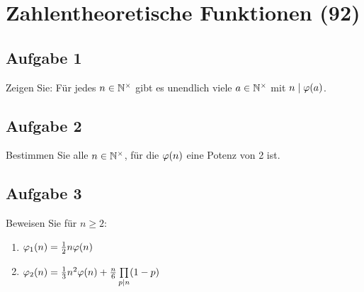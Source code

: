 \section{Zahlentheoretische Funktionen (92)}

\subsection{Aufgabe 1}
Zeigen Sie: Für jedes $n \in \mathbb{N}^\times$ gibt es
unendlich viele $a \in \mathbb{N}^\times$ mit $n \mid \phifunc{a}$.

\subsection{Aufgabe 2}
Bestimmen Sie alle $n \in \mathbb{N}^\times$, für die $\phifunc{n}$ eine Potenz von 2 ist.

\subsection{Aufgabe 3}
Beweisen Sie für $n \geq 2$:
\begin{enumerate}[label=\alph*)]
  \item $\phifunc{n}_1 = \frac{1}{2} n \phifunc{n}$
  \item $\phifunc{n}_2 = \frac{1}{3} n^2 \phifunc{n} +
          \frac{n}{6} \prod\limits_{p \mid n} (1 - p)$
\end{enumerate}
